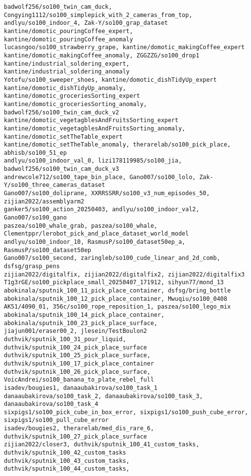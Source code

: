 \begin{verbatim}
badwolf256/so100_twin_cam_duck, Congying1112/so100_simplepick_with_2_cameras_from_top, 
andlyu/so100_indoor_4, Zak-Y/so100_grap_dataset
kantine/domotic_pouringCoffee_expert, kantine/domotic_pouringCoffee_anomaly
lucasngoo/so100_strawberry_grape, kantine/domotic_makingCoffee_expert
kantine/domotic_makingCoffee_anomaly, ZGGZZG/so100_drop1
kantine/industrial_soldering_expert, kantine/industrial_soldering_anomaly
Yotofu/so100_sweeper_shoes, kantine/domotic_dishTidyUp_expert
kantine/domotic_dishTidyUp_anomaly, kantine/domotic_groceriesSorting_expert
kantine/domotic_groceriesSorting_anomaly, badwolf256/so100_twin_cam_duck_v2
kantine/domotic_vegetagblesAndFruitsSorting_expert
kantine/domotic_vegetagblesAndFruitsSorting_anomaly, kantine/domotic_setTheTable_expert
kantine/domotic_setTheTable_anomaly, therarelab/so100_pick_place, abhisb/so100_51_ep
andlyu/so100_indoor_val_0, lizi178119985/so100_jia, badwolf256/so100_twin_cam_duck_v3
andrewcole712/so100_tape_bin_place, Gano007/so100_lolo, Zak-Y/so100_three_cameras_dataset
Gano007/so100_doliprane, XXRRSSRR/so100_v3_num_episodes_50, zijian2022/assemblyarm2
ganker5/so100_action_20250403, andlyu/so100_indoor_val2, Gano007/so100_gano
paszea/so100_whale_grab, paszea/so100_whale, Clementppr/lerobot_pick_and_place_dataset_world_model
andlyu/so100_indoor_10, RasmusP/so100_dataset50ep_a, RasmusP/so100_dataset50ep
Gano007/so100_second, zaringleb/so100_cude_linear_and_2d_comb, dsfsg/grasp_pens
zijian2022/digitalfix, zijian2022/digitalfix2, zijian2022/digitalfix3
T1g3rGE/so100_pickplace_small_20250407_171912, sihyun77/mond_13
abokinala/sputnik_100_11_pick_place_container, dsfsg/bring_bottle
abokinala/sputnik_100_12_pick_place_container, Mwuqiu/so100_0408
AK51/4090_01, 356c/so100_rope_reposition_1, paszea/so100_lego_mix
abokinala/sputnik_100_14_pick_place_container, abokinala/sputnik_100_23_pick_place_surface, 
jiajun001/eraser00_2, jlesein/TestBoulon2 
duthvik/sputnik_100_31_pour_liquid, duthvik/sputnik_100_24_pick_place_surface
duthvik/sputnik_100_25_pick_place_surface, duthvik/sputnik_100_17_pick_place_container
duthvik/sputnik_100_26_pick_place_surface, VoicAndrei/so100_banana_to_plate_rebel_full
isadev/bougies1, danaaubakirova/so100_task_1
danaaubakirova/so100_task_2, danaaubakirova/so100_task_3, danaaubakirova/so100_task_4
sixpigs1/so100_pick_cube_in_box_error, sixpigs1/so100_push_cube_error, sixpigs1/so100_pull_cube_error
isadev/bougies2, therarelab/med_dis_rare_6, duthvik/sputnik_100_27_pick_place_surface
zijian2022/closer3, duthvik/sputnik_100_41_custom_tasks, duthvik/sputnik_100_42_custom_tasks
duthvik/sputnik_100_43_custom_tasks, duthvik/sputnik_100_44_custom_tasks, 

\end{verbatim}
